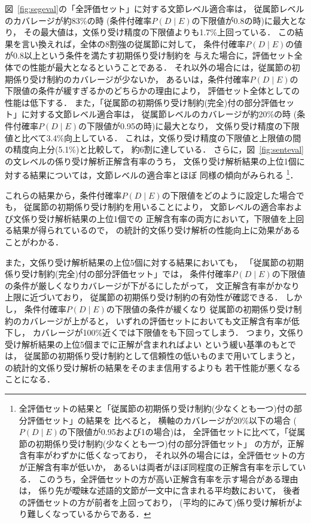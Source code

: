 図~\ref{fig:segeval}の「全評価セット」に対する文節レベル適合率は，
従属節レベルの\mbox{カバレージが約83\%の}時
(条件付確率$P(D\mid E)$の下限値が0.8の時)に最大となり，
その最大値は，文係り受け精度の下限値よりも1.7\%上回っている．
この結果を言い換えれば，全体の8割強の従属節に対して，
条件付確率$P(D\mid E)$の値が0.8以上という条件を満たす初期係り受け制約を
与えた場合に，評価セット全体での性能が最大となるということである．
それ以外の場合には，従属節の初期係り受け制約のカバレージが少ないか，
あるいは，条件付確率$P(D\mid E)$の下限値の条件が緩すぎるかのどちらかの理由により，
評価セット全体としての性能は低下する．
また，「従属節の初期係り受け制約(完全)付の部分評価セット」に対する文節レベル適合率は，
従属節レベルのカバレージが約20\%の時
(条件付確率$P(D\mid E)$の下限値が0.95の時)に最大となり，
文係り受け精度の下限値と比べて3.4\%向上している．
これは，文係り受け精度の下限値と上限値の間の精度向上分(5.1\%)と比較して，
約6割に達している．
さらに，図~\ref{fig:senteval}の文レベルの係り受け解析正解含有率のうち，
文係り受け解析結果の上位1個に対する結果については，文節レベルの適合率とほぼ
同様の傾向がみられる
\footnote{
  全評価セットの結果と「従属節の初期係り受け制約(少なくとも一つ)付の部分評価セット」の結果を
  比べると，
  横軸のカバレージが20\%以下の場合
  ($P(D\mid E)$の下限値が0.95および1の場合)は，
  全評価セットに比べて，「従属節の初期係り受け制約(少なくとも一つ)付の部分評価セット」
  の方が，正解含有率がわずかに低くなっており，
  それ以外の場合には，全評価セットの方が正解含有率が低いか，
  あるいは両者がほぼ同程度の正解含有率を示している．
  このうち，\mbox{全評}価セットの方が高い正解含有率を示す場合がある理由は，
  係り先が曖昧な述語的文節が一文中に含まれる平均数において，
  後者の評価セットの方が前者を上回っており，
  (平均的にみて)係り受け解析がより難しくなっているからである．
}．

これらの結果から，条件付確率$P(D\mid E)$の下限値をどのように設定した場合でも，
従属節の初期係り受け制約を用いることにより，
文節レベルの適合率および文係り受け解析結果の上位1個での
正解含有率の両方において，下限値を上回る結果が得られているので，
\cite{Fujio97aj,Fujio99aj}の統計的文係り受け解析の性能向上に効果があることがわかる．

また，文係り受け解析結果の上位5個に対する結果においても，
「従属節の初期係り受け制約(完全)付の部分評価セット」では，
条件付確率$P(D\mid E)$の下限値の条件が厳しくなりカバレージが下がるにしたがって，
文正解含有率がかなり上限に近づいており，
従属節の初期係り受け制約の有効性が確認できる．
しかし，
条件付確率$P(D\mid E)$の下限値の条件が緩くなり
従属節の初期係り受け制約のカバレージが上がると，
いずれの評価セットにおいても文正解含有率が低下し，
カバレージが100\%近くでは下限値をも下回ってしまう．
つまり，文係り受け解析結果の上位5個までに正解が含まれればよい
という緩い基準のもとでは，
従属節の初期係り受け制約として信頼性の低いものまで用いてしまうと，
\cite{Fujio97aj,Fujio99aj}の統計的文係り受け解析の結果をそのまま信用するよりも
若干性能が悪くなることになる．

